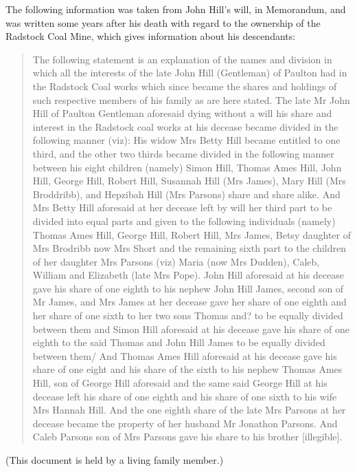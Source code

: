 The following information was taken from John Hill's will, in Memorandum, and was  written some years after his death with regard to the ownership of the Radstock Coal Mine, which gives information about his descendants:

\begin{quotation}
The following statement is an explanation of the names and division in which all the interests of the late John Hill (Gentleman) of Paulton had in the Radstock Coal works which since became the shares and holdings of such respective members of his family as are here stated. The late Mr John Hill of Paulton Gentleman aforesaid dying without a will his share and interest in the Radstock coal works at his decease became divided in the following manner (viz): His widow Mrs Betty Hill became entitled to one third, and the other two thirds became divided in the following manner between his eight children (namely) Simon Hill, Thomas Ames Hill, John Hill, George Hill, Robert Hill, Susannah Hill (Mrs James), Mary Hill (Mrs Broddribb), and Hepzibah Hill (Mrs Parsons) share and share alike. And Mrs Betty Hill aforesaid at her decease left by will her third part to be divided into equal parts and given to the following individuals (namely) Thomas Ames Hill, George Hill, Robert Hill, Mrs James, Betsy daughter of Mrs Brodribb now Mrs Short and the remaining sixth part to the children of her daughter Mrs Parsons (viz) Maria (now Mrs Dudden), Caleb, William and Elizabeth (late Mrs Pope). John Hill aforesaid at his decease gave his share of one eighth to his nephew John Hill James, second son of Mr James, and Mrs James at her decease gave her share of one eighth and her share of one sixth to her two sons Thomas and? to be equally divided between them and Simon Hill aforesaid at his decease gave his share of one eighth to the said Thomas and John Hill James to be equally divided between them/ And Thomas Ames Hill aforesaid at his decease gave his share of one eight and his share of the sixth to his nephew Thomas Ames Hill, son of George Hill aforesaid and the same said George Hill at his decease left his share of one eighth and his share of one sixth to his wife Mrs Hannah Hill. And the one eighth share of the late Mrs Parsons at her decease became the property of her husband Mr Jonathon Parsons. And Caleb Parsons son of Mrs Parsons gave his share to his brother [illegible].
\end{quotation}

(This document is held by a living family member.)
